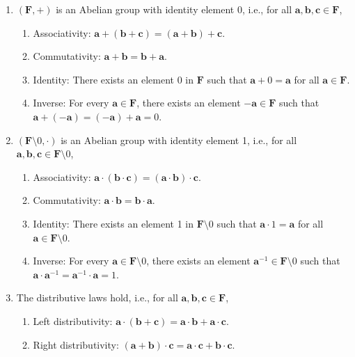 \begin{enumerate}
\item $(\mathbf{F},+)$ is an Abelian group with identity element 0, i.e., for all $\mathbf{a,b,c} \in \mathbf{F}$,
\begin{enumerate}
\item Associativity: $\mathbf{a}+( \mathbf{b}+\mathbf{c}) = (\mathbf{a}+\mathbf{b})+\mathbf{c}$.
\item Commutativity: $\mathbf{a}+\mathbf{b} = \mathbf{b}+\mathbf{a}$.
\item Identity: There exists an element 0 in $\mathbf{F}$ such that $\mathbf{a}+0 = \mathbf{a}$ for all $\mathbf{a} \in \mathbf{F}$.
\item Inverse: For every $\mathbf{a} \in \mathbf{F}$, there exists an element $-\mathbf{a} \in \mathbf{F}$ such that $\mathbf{a}+(-\mathbf{a}) = (-\mathbf{a})+\mathbf{a} = 0$.
\end{enumerate}
\item $(\mathbf{F}\setminus{0},\cdot)$ is an Abelian group with identity element 1, i.e., for all $\mathbf{a,b,c} \in \mathbf{F}\setminus{0}$,
\begin{enumerate}
\item Associativity: $\mathbf{a}\cdot (\mathbf{b}\cdot \mathbf{c}) = (\mathbf{a}\cdot \mathbf{b})\cdot \mathbf{c}$.
\item Commutativity: $\mathbf{a}\cdot \mathbf{b} = \mathbf{b}\cdot \mathbf{a}$.
\item Identity: There exists an element 1 in $\mathbf{F}\setminus{0}$ such that $\mathbf{a}\cdot 1 = \mathbf{a}$ for all $\mathbf{a} \in \mathbf{F}\setminus{0}$.
\item Inverse: For every $\mathbf{a} \in \mathbf{F}\setminus{0}$, there exists an element $\mathbf{a}^{-1} \in \mathbf{F}\setminus{0}$ such that $\mathbf{a}\cdot \mathbf{a}^{-1} = \mathbf{a}^{-1}\cdot \mathbf{a} = 1$.
\end{enumerate}
\item The distributive laws hold, i.e., for all $\mathbf{a,b,c} \in \mathbf{F}$,
\begin{enumerate}
\item Left distributivity: $\mathbf{a}\cdot(\mathbf{b}+\mathbf{c}) = \mathbf{a}\cdot \mathbf{b} + \mathbf{a}\cdot \mathbf{c}$.
\item Right distributivity: $(\mathbf{a}+\mathbf{b})\cdot \mathbf{c} = \mathbf{a}\cdot \mathbf{c} + \mathbf{b}\cdot \mathbf{c}$.
\end{enumerate}
\end{enumerate}

